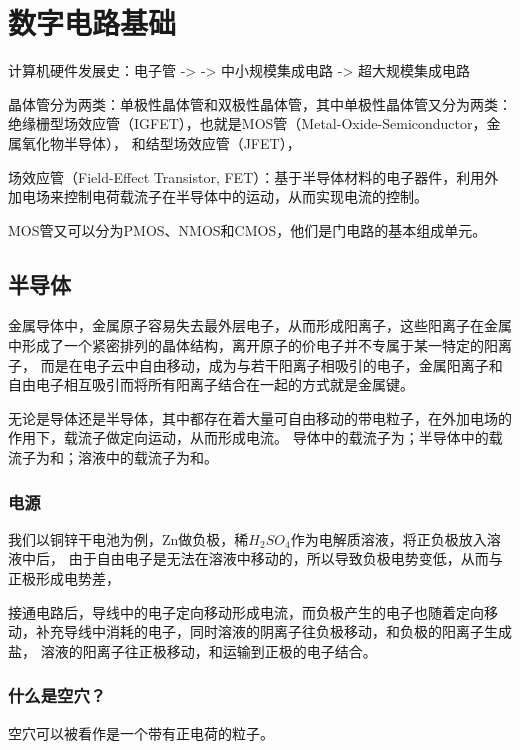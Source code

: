 \documentclass{template}
\begin{document}
\ttfamily
\section{数字电路基础}
    计算机硬件发展史：电子管 ->  -> 中小规模集成电路 -> 超大规模集成电路

    晶体管分为两类：单极性晶体管和双极性晶体管，其中单极性晶体管又分为两类：绝缘栅型场效应管（IGFET），也就是MOS管（Metal-Oxide-Semiconductor，金属氧化物半导体），
    和结型场效应管（JFET），


    场效应管（Field-Effect Transistor, FET）：基于半导体材料的电子器件，利用外加电场来控制电荷载流子在半导体中的运动，从而实现电流的控制。

    MOS管又可以分为PMOS、NMOS和CMOS，他们是门电路的基本组成单元。

    \subsection{半导体}
        金属导体中，金属原子容易失去最外层电子，从而形成阳离子，这些阳离子在金属中形成了一个紧密排列的晶体结构，离开原子的价电子并不专属于某一特定的阳离子，
        而是在电子云中自由移动，成为与若干阳离子相吸引的电子，金属阳离子和自由电子相互吸引而将所有阳离子结合在一起的方式就是金属键。
            
        无论是导体还是半导体，其中都存在着大量可自由移动的带电粒子，在外加电场的作用下，载流子做定向运动，从而形成电流。
        导体中的载流子为；半导体中的载流子为和；溶液中的载流子为和。

        \subsubsection{电源}
            我们以铜锌干电池为例，Zn做负极，稀$H_2SO_4$作为电解质溶液，将正负极放入溶液中后，
            由于自由电子是无法在溶液中移动的，所以导致负极电势变低，从而与正极形成电势差，


            接通电路后，导线中的电子定向移动形成电流，而负极产生的电子也随着定向移动，补充导线中消耗的电子，同时溶液的阴离子往负极移动，和负极的阳离子生成盐，
            溶液的阳离子往正极移动，和运输到正极的电子结合。



        \subsubsection{什么是空穴？}
            空穴可以被看作是一个带有正电荷的粒子。
\end{document}

